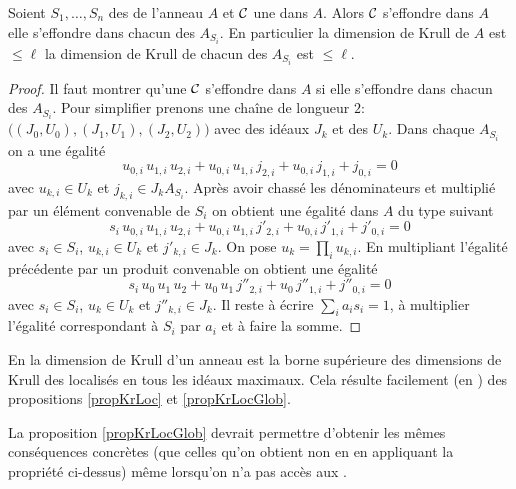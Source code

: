\begin{proposition} 
\label{propKrLocGlob} 
Soient  $S_1,\ldots ,S_n$  des \moco  de l'anneau $A$ et ${\cal C}$ une \proc 
dans $A$. Alors ${\cal C}$ s'effondre dans $A$ \ssi elle  s'effondre dans chacun 
des
 $A_{S_i}$. En particulier la dimension de Krull de $A$ est $\leq \ell$ 
\ssi
la dimension de Krull de chacun des  $A_{S_i}$ est $\leq \ell$.
\end{proposition}
\begin{proof}
Il faut montrer qu'une \proc ${\cal C}$ s'effondre dans $A$ si elle  s'effondre 
dans chacun des $A_{S_i}$. Pour simplifier prenons une chaîne de 
longueur $2$: $\big((J_0,U_0),(J_1,U_1),(J_2,U_2)\big)$ avec des idéaux $J_k$  
et des \mos $U_k$. Dans chaque  $A_{S_i}$ on a une égalité
$$ u_{0,i}\,u_{1,i}\,u_{2,i}+u_{0,i}\,u_{1,i}\,j_{2,i} 
+u_{0,i}\,j_{1,i}+j_{0,i}=0
$$
avec $u_{k,i}\in U_k$ et  $j_{k,i}\in J_kA_{S_i}$.
Après avoir chassé les dénominateurs et multiplié par un 
élément convenable de $S_i$ on obtient une égalité dans $A$ du 
type suivant
$$ s_i\,u_{0,i}\,u_{1,i}\,u_{2,i}+u_{0,i}\,u_{1,i}\,j'_{2,i} 
+u_{0,i}\,j'_{1,i}+j'_{0,i}=0
$$
avec $s_i\in S_i$, $u_{k,i}\in U_k$ et  $j'_{k,i}\in J_k$.
On pose $u_k=\prod_iu_{k,i}$. En multipliant l'égalité précédente 
par un produit convenable on obtient une égalité
$$ s_i\,u_{0}\,u_{1}\,u_{2}+u_{0}\,u_{1}\,j''_{2,i} 
+u_{0}\,j''_{1,i}+j''_{0,i}=0
$$
avec $s_i\in S_i$, $u_{k}\in U_k$ et  $j''_{k,i}\in J_k$.
Il reste à écrire $\sum_i a_is_i=1$, à multiplier l'égalité
correspondant à $S_i$ par $a_i$ et à faire la somme.
\end{proof}

En \clama la dimension de Krull d'un anneau est la borne supérieure
des dimensions de Krull des localisés en tous les idéaux maximaux.
Cela résulte facilement (en \clama) des propositions \ref{propKrLoc} et 
\ref{propKrLocGlob}.

La proposition \ref{propKrLocGlob}  devrait permettre d'obtenir \cot les 
mêmes conséquences concrètes (que celles qu'on obtient non \cot en 
\clama en appliquant la propriété ci-dessus) même lorsqu'on n'a pas 
accès aux \ideps.  

